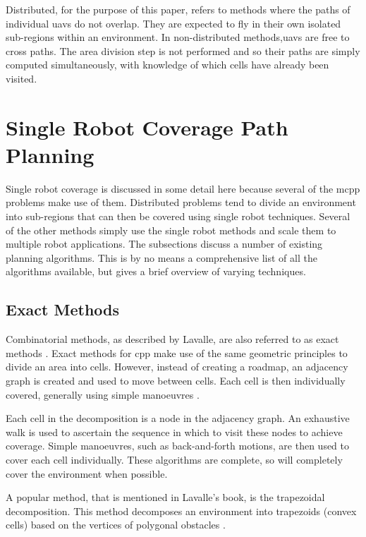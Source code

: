 Distributed, for the purpose of this paper, refers to methods where the paths of individual \acp{uav} do not overlap. They are expected to fly in their own isolated sub-regions within an environment. In non-distributed methods,\acsp{uav} are free to cross paths. The area division step is not performed and so their paths are simply computed simultaneously, with knowledge of which cells have already been visited. \cite{Juan2018}

\section{Single Robot Coverage Path Planning}
\label{sec:LR sCPP}
Single robot coverage is discussed in some detail here because several of the \ac{mcpp} problems make use of them. Distributed problems tend to divide an environment into sub-regions that can then be covered using single robot techniques. Several of the other methods simply use the single robot methods and scale them to multiple robot applications. The subsections discuss a number of existing planning algorithms. This is by no means a comprehensive list of all the algorithms available, but gives a brief overview of varying techniques.%
\subsection{Exact Methods}
\label{sec:LR - sExact}
Combinatorial methods, as described by Lavalle, are also referred to as exact methods \cite{Lavalle2006}. Exact methods for \ac{cpp} make use of the same geometric principles to divide an area into cells. However, instead of creating a roadmap, an adjacency graph is created and used to move between cells. Each cell is then individually covered, generally using simple manoeuvres \cite{CPP-Survey-2013}. 

Each cell in the decomposition is a node in the adjacency graph. An exhaustive walk is used to ascertain the sequence in which to visit these nodes to achieve coverage. Simple manoeuvres, such as back-and-forth motions, are then used to cover each cell individually. These algorithms are complete, so will completely cover the environment when possible. \cite{Choset-Bous1997}

A popular method, that is mentioned in Lavalle's book, is the trapezoidal decomposition. This method decomposes an environment into trapezoids (convex cells) based on the vertices of polygonal obstacles \cite{Lavalle2006}.

